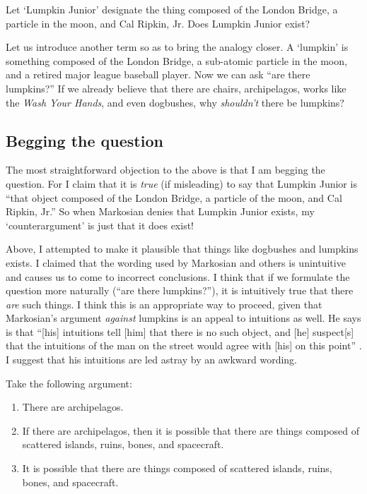 \documentclass[11pt]{article}
\begin{document}
\begin{spacing}{1.25}
Let `Lumpkin Junior' designate the thing composed of the London
Bridge, a particle in the moon, and Cal Ripkin, Jr.  Does Lumpkin
Junior exist?

Let us introduce another term so as to bring the analogy closer.  A
`lumpkin' is something composed of the London Bridge, a sub-atomic
particle in the moon, and a retired major league baseball player.  Now
we can ask ``are there lumpkins?''  If we already believe that there
are chairs, archipelagos, works like the {\em Wash Your Hands}, and
even dogbushes, why {\em shouldn't} there be lumpkins?

\subsection{Begging the question}
\label{beg}
The most straightforward objection to the above is that I am begging
the question.  For I claim that it is {\em true} (if misleading) to
say that Lumpkin Junior is ``that object composed of the London
Bridge, a particle of the moon, and Cal Ripkin, Jr.''  So when
Markosian denies that Lumpkin Junior exists, my `counterargument' is
just that it does exist!

Above, I attempted to make it plausible that things like dogbushes and
lumpkins exists.  I claimed that the wording used by Markosian and
others is unintuitive and causes us to come to incorrect conclusions.
I think that if we formulate the question more naturally (``are there
lumpkins?''), it is intuitively true that there {\em are} such things.
I think this is an appropriate way to proceed, given that Markosian's
argument {\em against} lumpkins is an appeal to intuitions as well.
He says is that ``[his] intuitions tell [him] that there is no such
object, and [he] suspect[s] that the intuitions of the man on the
street would agree with [his] on this point''
\citeyearpar[228]{markosian1998a}.  I suggest that his intuitions are
led astray by an awkward wording.

Take the following argument:

\begin{enumerate}
  \item There are archipelagos.
  \item If there are archipelagos, then it is possible that there are
    things composed of scattered islands, ruins, bones, and
    spacecraft.
  \item It is possible that there are things composed of scattered
    islands, ruins, bones, and spacecraft.
\end{enumerate}


\end{spacing}
\end{document}
